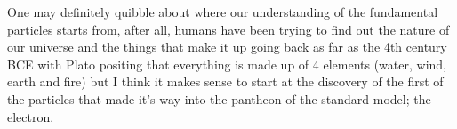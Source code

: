   One may definitely quibble about where our understanding of the fundamental particles starts from, after all, humans have been trying to find out the nature of our universe and the things that make it up going back as far as the 4th century BCE with Plato positing that everything is made up of 4 elements (water, wind, earth and fire)\cite{Timaeus} but I think it makes sense to start at the discovery of the first of the particles that made it's way into the pantheon of the standard model; the electron.



  






